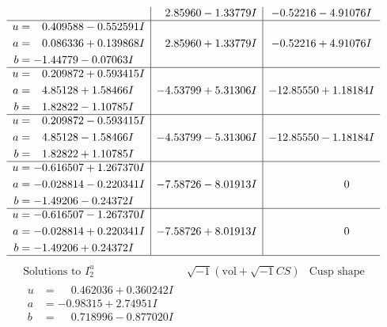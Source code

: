 \documentclass[1p]{elsarticle_modified}
\theoremstyle{definition}
\newcommand{\I}{\sqrt{-1}}
\begin{document}
$$\begin{array}{c|c|c}
 & \phantom{-}2.85960 - 1.33779 I & -0.52216 - 4.91076 I \\ \hline\begin{aligned}
u &= \phantom{-}0.409588 - 0.552591 I \\
a &= \phantom{-}0.086336 + 0.139868 I \\
b &= -1.44779 - 0.07063 I\end{aligned}
 & \phantom{-}2.85960 + 1.33779 I & -0.52216 + 4.91076 I \\ \hline\begin{aligned}
u &= \phantom{-}0.209872 + 0.593415 I \\
a &= \phantom{-}4.85128 + 1.58466 I \\
b &= \phantom{-}1.82822 - 1.10785 I\end{aligned}
 & -4.53799 + 5.31306 I & -12.85550 + 1.18184 I \\ \hline\begin{aligned}
u &= \phantom{-}0.209872 - 0.593415 I \\
a &= \phantom{-}4.85128 - 1.58466 I \\
b &= \phantom{-}1.82822 + 1.10785 I\end{aligned}
 & -4.53799 - 5.31306 I & -12.85550 - 1.18184 I \\ \hline\begin{aligned}
u &= -0.616507 + 1.267370 I \\
a &= -0.028814 - 0.220341 I \\
b &= -1.49206 - 0.24372 I\end{aligned}
 & -7.58726 - 8.01913 I & \phantom{-0.000000 } 0 \\ \hline\begin{aligned}
u &= -0.616507 - 1.267370 I \\
a &= -0.028814 + 0.220341 I \\
b &= -1.49206 + 0.24372 I\end{aligned}
 & -7.58726 + 8.01913 I & \phantom{-0.000000 } 0\\
 \hline 
 \end{array}$$\newpage$$\begin{array}{c|c|c}  
\text{Solutions to }I^u_{2}& \I (\text{vol} + \sqrt{-1}CS) & \text{Cusp shape}\\
 \hline 
\begin{aligned}
u &= \phantom{-}0.462036 + 0.360242 I \\
a &= -0.98315 + 2.74951 I \\
b &= \phantom{-}0.718996 - 0.877020 I\end{aligned}

\end{array}$$
\end{document}
